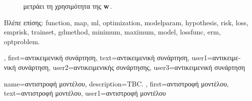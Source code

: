 {{\begin{figure}[H]
{{{			μετράει τη χρησιμότητα της} ${\bf w}$.\label{fig_obj_func_dict}} }
		\end{figure} 
		\foreignlanguage{greek}{Βλέπε επίσης:} \gls{function}, \gls{map}, \gls{ml}, \gls{optimization}, \gls{modelparam}, \gls{hypothesis}, \gls{risk}, 
		\gls{loss}, \gls{emprisk}, \gls{trainset}, \gls{gdmethod}, \gls{minimum}, \gls{maximum}, \gls{model}, \gls{lossfunc}, \gls{erm}, \gls{optproblem}.},
	first={\foreignlanguage{greek}{αντικειμενική συνάρτηση}},
	text={\foreignlanguage{greek}{αντικειμενική συνάρτηση}},
	user1={\foreignlanguage{greek}{αντικειμενική συνάρτηση}}, %
  	user2={\foreignlanguage{greek}{αντικειμενικής συνάρτησης}}, %
	user3={\foreignlanguage{greek}{αντικειμενική συνάρτηση}} %
}

{name={\foreignlanguage{greek}{αντιστροφή μοντέλου}},
 	description={TBC. },
 	first={\foreignlanguage{greek}{αντιστροφή μοντέλου}},
  	text={\foreignlanguage{greek}{αντιστροφή μοντέλου}},
	user1={\foreignlanguage{greek}{αντιστροφή μοντέλου}} %
}

